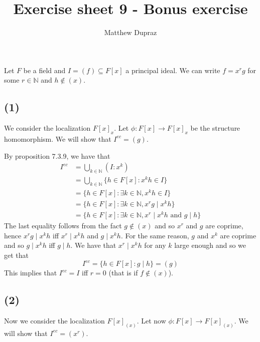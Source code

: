 \documentclass{article}
\title{Exercise sheet 9 - Bonus exercise}
\author{Matthew Dupraz}
\newcommand{\N}{\mathbb{N}}
\begin{document}
	
\maketitle

Let $F$ be a field and $I = (f) \subseteq F[x]$ a principal ideal.
We can write $f = x^rg$ for some $r \in \N$ and $h \not\in (x)$.

\subsection*{(1)}

We consider the localization $F[x]_x$. Let $\phi: F[x] \to F[x]_x$ be the
structure homomorphism. We will show that
$I^{ec} = (g)$.

By proposition 7.3.9, we have that
\begin{align*}
	I^{ec} &= \bigcup_{k \in \N} (I : x^k)\\
	&= \bigcup_{k \in \N} \{h \in F[x] : x^kh \in I \}\\
	&= \{h \in F[x] : \exists k \in \N, x^kh \in I\}\\
	&= \{h \in F[x] : \exists k \in \N, x^rg \mid x^kh\}\\
	&= \{h \in F[x] : \exists k \in \N, x^r \mid x^kh
	\textrm{ and } g \mid h\}
\end{align*}
The last equality follows from the fact $g \not\in (x)$ and so $x^r$ 
and $g$ are coprime, hence $x^rg \mid x^kh$ iff $x^r \mid x^kh$ and
$g \mid x^k h$. For the same reason, $g$ and $x^k$ are coprime and so
$g \mid x^k h$ iff $g \mid h$. We have that $x^r \mid x^k h$ for any $k$
large enough and so we get that
\begin{equation*}
	I^{ec} = \{h \in F[x]: g \mid h\} = (g)
\end{equation*}
This implies that $I^{ec} = I$ iff $r = 0$ (that is if $f \not\in (x)$).

\subsection*{(2)}

Now we consider the localization $F[x]_{(x)}$. Let now
$\phi: F[x] \to F[x]_{(x)}$. We will show that $I^{ec} = (x^r)$.
\end{document}

